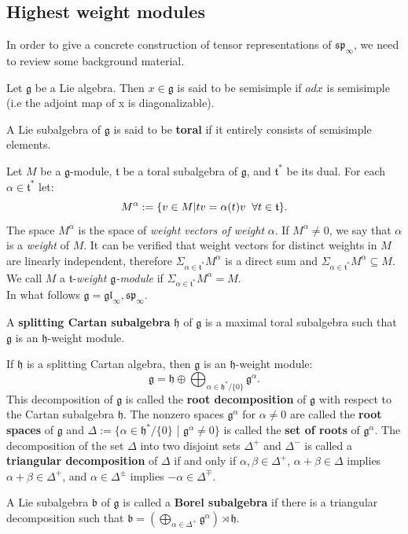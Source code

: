 \subsection{Highest weight modules }
In order to give a concrete construction of tensor representations of $\mathfrak{sp}_{\infty}$, we need to review some background material. 
\begin{defn}
Let $\mathfrak{g}$ be a Lie algebra. Then $x\in\mathfrak{g}$ is said to be semisimple if $ad x$ is semisimple (i.e the adjoint map of x is diagonalizable).
\end{defn}
\begin{defn}
A Lie subalgebra of $\mathfrak{g}$ is said to be \textbf{toral} if it entirely consists of semisimple elements. 
\end{defn}
Let $M$ be a $\mathfrak{g}$-module, $\mathfrak{t}$ be a toral subalgebra of $\mathfrak{g}$, and $\mathfrak{t}^{*}$ be its dual.
For each $\alpha\in \mathfrak{t}^{*}$ let:
$$M^{\alpha}:=\{v\in M|tv=\alpha(t)v \hspace{2mm} \forall t\in \mathfrak{t}\}.$$
The space $M^{\alpha}$ is the space of \textit{weight vectors of weight} $\alpha.$
If $M^{\alpha}\neq 0$, we say that $\alpha$ is a \textit{weight} of $M$. It can be verified that weight vectors for distinct weights in $M$ are linearly independent, therefore $\Sigma_{\alpha\in \mathfrak{t}^{*}} M^{\alpha}$ is a direct sum and $\Sigma_{\alpha\in \mathfrak{t}^{*}} M^{\alpha}\subseteq M$. We call $M$ a $\mathfrak{t}$-\textit{weight $\mathfrak{g}$-module}  if $\Sigma_{\alpha\in \mathfrak{t}^{*}} M^{\alpha}=M$. 
\\In what follows $\mathfrak{g}=\mathfrak{gl}_{\infty}, \mathfrak{sp}_{\infty}.$
\begin{defn}
A \textbf{splitting Cartan subalgebra} $\mathfrak{h}$ of $\mathfrak{g}$ is a maximal toral subalgebra such that $\mathfrak{g}$ is an  $\mathfrak{h}$-weight module.
\end{defn}
If $\mathfrak{h}$ is a splitting Cartan algebra, then $\mathfrak{g}$ is an $\mathfrak{h}$-weight module:
$$\mathfrak{g}=\mathfrak{h}\oplus\bigoplus_{\alpha\in{\mathfrak{h}}^{*}/\{0\}}\mathfrak{g}^{\alpha}.$$
This decomposition of $\mathfrak{g}$ is called the \textbf{root decomposition} of $\mathfrak{g}$ with respect to the Cartan subalgebra $\mathfrak{h}$. The nonzero spaces $\mathfrak{g}^{\alpha}$ for $\alpha\ne 0$ are called the \textbf{root spaces} of $\mathfrak{g}$ and $\Delta:=\{\alpha \in \mathfrak{h}^{*}/\{0\}$ | $\mathfrak{g}^{\alpha}\ne 0\}$ is called the \textbf{set of roots} of $\mathfrak{g}^{\alpha}$.
The decomposition of the set $\Delta$ into two disjoint sets $\Delta^{+}$ and $\Delta^{-}$ is called a \textbf{triangular decomposition} of $\Delta$ if and only if $\alpha,\beta \in \Delta^{+}$, $\alpha+\beta\in \Delta$ implies $\alpha+\beta \in{\Delta^{+}}$, and $\alpha\in\Delta^{\pm}$ implies $-\alpha\in\Delta^{\mp}$.
\\
\begin{defn}
A Lie subalgebra $\mathfrak{b}$ of $\mathfrak{g}$ is called a \textbf{Borel subalgebra} if there is a triangular decomposition such that $\mathfrak{b}=(\bigoplus_{\alpha\in\Delta^{+}}\mathfrak{g}^{\alpha})\rtimes\mathfrak{h}.$ 
\end{defn} 

